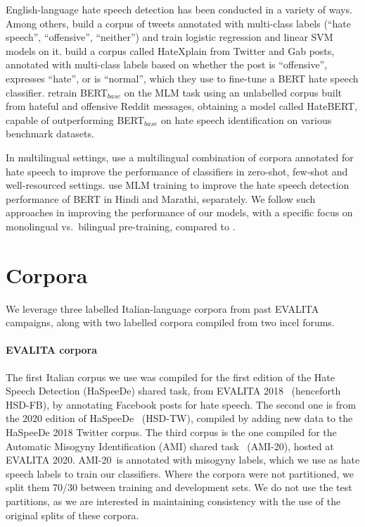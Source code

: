 \documentclass[
twocolumn,
]{ceurart}
\newcommand{\hsdfb}{\mbox{HSD-FB}}
\newcommand{\hsdtw}{\mbox{HSD-TW}}
\newcommand{\ami}{\mbox{AMI-20}}
\begin{document}
English-language hate speech detection has been conducted in a variety of ways. Among others, \citet{davidson-2017-automated-hate} build a corpus of tweets annotated with multi-class labels (``hate speech'', ``offensive'', ``neither'') and train logistic regression and linear SVM models on it.
\citet{mathew2021hatexplain} build a corpus called HateXplain from Twitter and Gab posts, annotated with multi-class labels based on whether the post is ``offensive'', expresses ``hate'', or is ``normal'', which they use to fine-tune a BERT hate speech classifier.
\citet{caselli-etal-2021-hatebert} retrain BERT$_{base}$ on the MLM task using an unlabelled corpus built from hateful and offensive Reddit messages, obtaining a model called HateBERT, capable of outperforming BERT$_{base}$ on hate speech identification on various benchmark datasets.

In multilingual settings, \citet{peliconInvestigatingCrosslingualTraining2021} use a multilingual combination of corpora annotated for hate speech to improve the performance of classifiers in zero-shot, few-shot and well-resourced settings. \citet{gokhaleSpreadLoveNot2022} use MLM training to improve the hate speech detection performance of BERT in Hindi and Marathi, separately. We follow such approaches in improving the performance of our models, with a specific focus on monolingual vs.\ bilingual pre-training, compared to \citet{gajo2023identification}.

\section{Corpora}
\label{sec:corpora}

We leverage three labelled Italian-language corpora from past EVALITA
campaigns, along with two labelled corpora compiled from two incel forums.
\paragraph{EVALITA corpora}
The first Italian corpus we use was compiled for the first edition of the Hate Speech Detection (HaSpeeDe) shared task, from EVALITA 2018~\cite{boscoOverviewEVALITA2018} (henceforth \hsdfb), by annotating Facebook posts for hate speech. The second one is from the 2020 edition of HaSpeeDe~\cite{Sanguinetti2020haspeedeeoverview} (\hsdtw), compiled by adding new data to the HaSpeeDe 2018 Twitter corpus. The third corpus is the one compiled for the Automatic Misogyny Identification (AMI) shared task~\cite{fersiniAMIEVALITA2020Automatic2020} (\ami), hosted at EVALITA 2020. \ami\, is annotated with misogyny labels, which we use as hate speech labels to train our classifiers.
Where the corpora were not partitioned,
we split them 
70/30 between training and development sets. We do not use the test partitions, as we are interested in maintaining consistency with the use of the original splits of these corpora.
\end{document}

